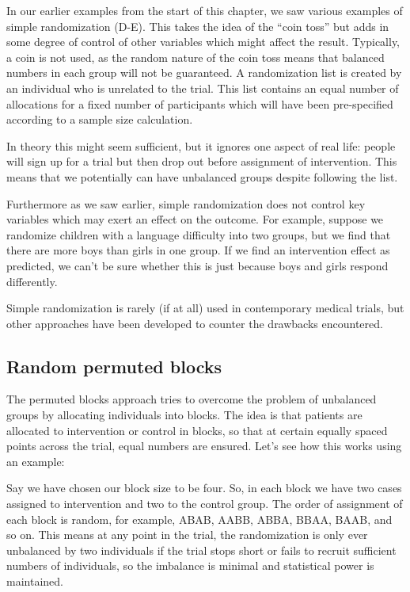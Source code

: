 \documentclass{krantz}
\begin{document}
In our earlier examples from the start of this chapter, we saw various examples of simple randomization (D-E). This takes the idea of the ``coin toss'' but adds in some degree of control of other variables which might affect the result. Typically, a coin is not used, as the random nature of the coin toss means that balanced numbers in each group will not be guaranteed. A randomization list is created by an individual who is unrelated to the trial. This list contains an equal number of allocations for a fixed number of participants which will have been pre-specified according to a sample size calculation.

In theory this might seem sufficient, but it ignores one aspect of real life: people will sign up for a trial but then drop out before assignment of intervention. This means that we potentially can have unbalanced groups despite following the list.

Furthermore as we saw earlier, simple randomization does not control key variables which may exert an effect on the outcome. For example, suppose we randomize children with a language difficulty into two groups, but we find that there are more boys than girls in one group. If we find an intervention effect as predicted, we can't be sure whether this is just because boys and girls respond differently.

Simple randomization is rarely (if at all) used in contemporary medical trials, but other approaches have been developed to counter the drawbacks encountered.

\hypertarget{random-permuted-blocks}{%
\subsection{Random permuted blocks}\label{random-permuted-blocks}}

The permuted blocks approach tries to overcome the problem of unbalanced groups by allocating individuals into blocks. The idea is that patients are allocated to intervention or control in blocks, so that at certain equally spaced points across the trial, equal numbers are ensured. Let's see how this works using an example:

Say we have chosen our block size to be four. So, in each block we have two cases assigned to intervention and two to the control group. The order of assignment of each block is random, for example, ABAB, AABB, ABBA, BBAA, BAAB, and so on. This means at any point in the trial, the randomization is only ever unbalanced by two individuals if the trial stops short or fails to recruit sufficient numbers of individuals, so the imbalance is minimal and statistical power is maintained.
\end{document}
